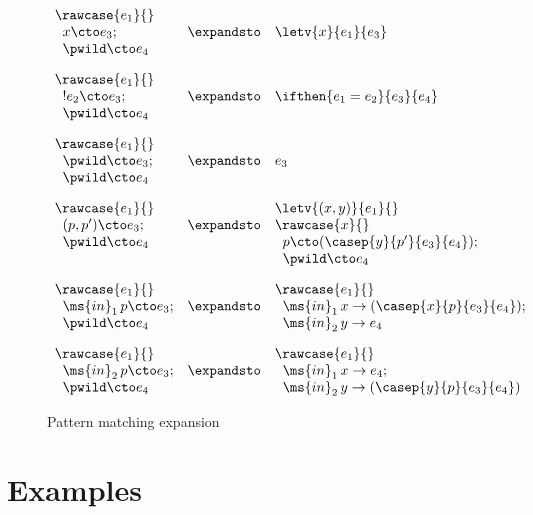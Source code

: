 \begin{figure}
  \begin{displaymath}
    \begin{array}{lcl}
      \rawcase{e_1}{}       &            & \\
      \;\;x \cto e_3;       & \expandsto & \letv{x}{e_1}{e_3} \\
      \;\;\pwild \cto e_4   &            &
      \\[1em]
      \rawcase{e_1}{}       &            & \\
      \;\;!e_2 \cto e_3;    & \expandsto & \ifthen{e_1 = e_2}{e_3}{e_4} \\
      \;\;\pwild \cto e_4   &            &
      \\[1em]
      \rawcase{e_1}{}       &            & \\
      \;\;\pwild \cto e_3;  & \expandsto & e_3 \\
      \;\;\pwild \cto e_4   &            &
      \\[1em]
      \rawcase{e_1}{}       &            & \letv{(x,y)}{e_1}{} \\
      \;\;(p,p') \cto e_3;  & \expandsto & \rawcase{x}{} \\
      \;\;\pwild \cto e_4   &            & \;\;p \cto (\casep{y}{p'}{e_3}{e_4}); \\
                            &            & \;\;\pwild \cto e_4
      \\[1em]
      \rawcase{e_1}{}           &            & \rawcase{e_1}{} \\
      \;\;\ms{in}_1\, p \cto e_3; & \expandsto & \;\;\ms{in}_1\, x \to (\casep{x}{p}{e_3}{e_4}); \\
      \;\;\pwild \cto e_4       &            & \;\;\ms{in}_2\, y \to e_4
      \\[1em]
      \rawcase{e_1}{}           &            & \rawcase{e_1}{} \\
      \;\;\ms{in}_2\, p \cto e_3; & \expandsto & \;\;\ms{in}_1\, x \to e_4; \\
      \;\;\pwild \cto e_4       &            & \;\;\ms{in}_2\, y \to (\casep{y}{p}{e_3}{e_4})
    \end{array}
  \end{displaymath}
  \caption{Pattern matching expansion}
  \label{fig:pattern-expand}
\end{figure}


\section{Examples}

